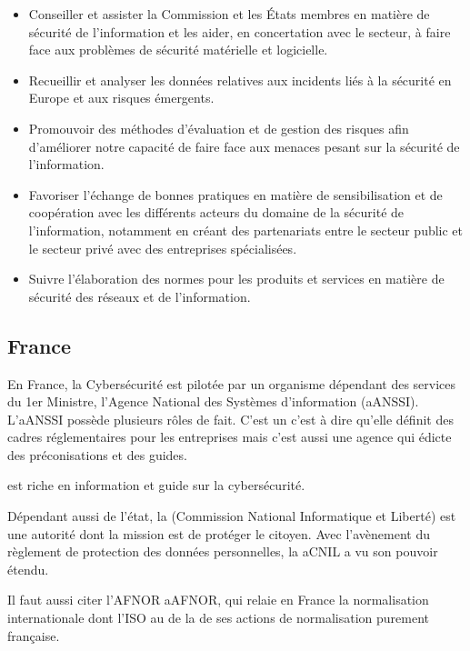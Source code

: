 \begin{itemize}
  \item Conseiller et assister la Commission et les États membres en matière de sécurité de l'information et les aider, en concertation avec le secteur, à faire face aux problèmes de sécurité matérielle et logicielle.
  \item Recueillir et analyser les données relatives aux incidents liés à la sécurité en Europe et aux risques émergents.
  \item Promouvoir des méthodes d'évaluation et de gestion des risques afin d'améliorer notre capacité de faire face aux menaces pesant sur la sécurité de l'information.
  \item Favoriser l'échange de bonnes pratiques en matière de sensibilisation et de coopération avec les différents acteurs du domaine de la sécurité de l'information, notamment en créant des partenariats entre le secteur public et le secteur privé avec des entreprises spécialisées.
  \item Suivre l'élaboration des normes pour les produits et services en matière de sécurité des réseaux et de l'information.
\end{itemize}

\subsection{France}

En France, la Cybersécurité est pilotée par un organisme dépendant des services du 1er Ministre,  l'Agence National des Systèmes d'information (\gls{aANSSI}).
L'\gls{aANSSI} possède plusieurs rôles de fait. C'est un  c'est à dire qu'elle définit des cadres réglementaires pour les entreprises mais c'est aussi une agence qui édicte des préconisations et des guides.

  est riche en information et guide sur la cybersécurité.

Dépendant aussi de l'état, la  (Commission National Informatique et Liberté) est une autorité dont la mission est de protéger le citoyen. Avec l'avènement du règlement de protection des données personnelles, la \gls{aCNIL} a vu son pouvoir étendu.  

Il faut aussi citer l'AFNOR \gls{aAFNOR}, qui relaie en France la normalisation internationale dont l'ISO au de la de ses actions de normalisation purement française.

